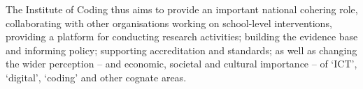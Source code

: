 \documentclass[conference]{IEEEtran}
\begin{document}
The Institute of Coding thus aims to provide an important national cohering role,
collaborating with other organisations working on school-level
interventions, providing a platform for conducting research
activities; building the evidence base and informing policy;
supporting accreditation and standards; as well as changing the wider
perception -- and economic, societal and cultural importance -- of
`ICT', `digital', `coding' and other cognate areas.





 
\end{document}
